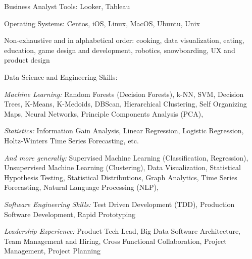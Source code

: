 \documentclass[10pt,a4paper]{article}
\begin{document}
\vspace{0.5em}
\inlineheadsection
  {Business Analyst Tools:}
  {Looker, Tableau}

\vspace{0.5em}
\inlineheadsection
  {Operating Systems:}
  {Centos, iOS, Linux, MacOS, Ubuntu, Unix}





\spacedhrule{1.6em}{-0.4em}


\inlineheadsection
  {Non-exhaustive and in alphabetical order:}
  {cooking, data visualization, eating, education, game design and development, robotics, snowboarding, UX and product design}





\inlineheadsection  %
  {Data Science and Engineering Skills:}
  {

    \textit{Machine Learning:} Random Forests (Decision Forests), k-NN, SVM, Decision Trees, K-Means, K-Medoids, DBScan, Hierarchical Clustering, Self Organizing Maps, Neural Networks, Principle Components Analysis (PCA),

    \vspace{0.5em}
    \textit{Statistics:} Information Gain Analysis, Linear Regression, Logistic Regression, Holtz-Winters Time Series Forecasting, etc.

    \vspace{0.5em}
    \textit{And more generally:} Supervised Machine Learning (Classification, Regression), Unsupervised Machine Learning (Clustering), Data Visualization, Statistical Hypothesis Testing, Statistical Distributions, Graph Analytics, Time Series Forecasting, Natural Language Processing (NLP),


    \textit{Software Engineering Skills:} Test Driven Development (TDD), Production Software Development, Rapid Prototyping

    \textit{Leadership Experience:} Product Tech Lead, Big Data Software Architecture, Team Management and Hiring, Cross Functional Collaboration, Project Management, Project Planning
  }
\end{document}
